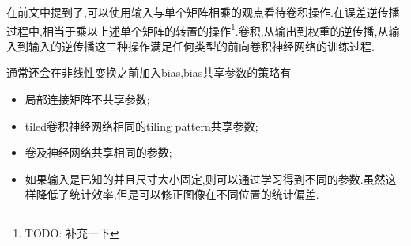 在前文中提到了,可以使用输入与单个矩阵相乘的观点看待卷积操作.在误差逆传播过程中,相当于乘以上述单个矩阵的转置的操作\footnote{TODO: 补充一下}.卷积,从输出到权重的逆传播,从输入到输入的逆传播这三种操作满足任何类型的前向卷积神经网络的训练过程.

通常还会在非线性变换之前加入bias,bias共享参数的策略有
\begin{itemize}
    \item 局部连接矩阵不共享参数;
    \item tiled卷积神经网络相同的tiling pattern共享参数;
    \item 卷及神经网络共享相同的参数;
    \item 如果输入是已知的并且尺寸大小固定,则可以通过学习得到不同的参数.虽然这样降低了统计效率,但是可以修正图像在不同位置的统计偏差.
\end{itemize}